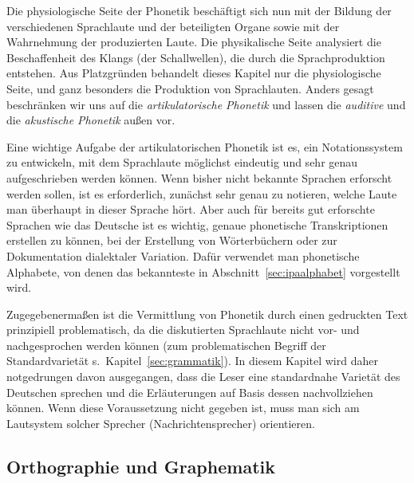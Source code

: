 Die physiologische Seite der Phonetik beschäftigt sich nun mit der Bildung der verschiedenen Sprachlaute und der beteiligten Organe sowie mit der Wahrnehmung der produzierten Laute.
Die physikalische Seite analysiert die Beschaffenheit des Klangs (der Schallwellen), die durch die Sprachproduktion entstehen.
Aus Platzgründen behandelt dieses Kapitel nur die physiologische Seite, und ganz besonders die Produktion von Sprachlauten.
Anders gesagt beschränken wir uns auf die \textit{artikulatorische Phonetik} und lassen die \textit{auditive} und die \textit{akustische Phonetik} außen vor.


Eine wichtige Aufgabe der artikulatorischen Phonetik ist es, ein Notationssystem zu entwickeln, mit dem Sprachlaute möglichst eindeutig und sehr genau aufgeschrieben werden können.
Wenn bisher nicht bekannte Sprachen erforscht werden sollen, ist es \zB erforderlich, zunächst sehr genau zu notieren, welche Laute man überhaupt in dieser Sprache hört.
Aber auch für bereits gut erforschte Sprachen wie das Deutsche ist es wichtig, genaue phonetische Transkriptionen erstellen zu können, \zB bei der Erstellung von Wörterbüchern oder zur Dokumentation dialektaler Variation.
Dafür verwendet man phonetische Alphabete, von denen das bekannteste in Abschnitt~\ref{sec:ipaalphabet} vorgestellt wird.

Zugegebenermaßen ist die Vermittlung von Phonetik durch einen gedruckten Text prinzipiell problematisch, da die diskutierten Sprachlaute nicht vor- und nachgesprochen werden können (zum problematischen Begriff der Standardvarietät s.\ Kapitel~\ref{sec:grammatik}).
In diesem Kapitel wird daher notgedrungen davon ausgegangen, dass die Leser eine standardnahe Varietät des Deutschen sprechen und die Erläuterungen auf Basis dessen nachvollziehen können.
Wenn diese Voraussetzung nicht gegeben ist, muss man sich am Lautsystem solcher Sprecher (\zB Nachrichtensprecher) orientieren.

\subsection{Orthographie und Graphematik}


